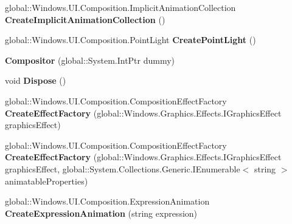 \begin{DoxyCompactItemize}
\item 
\mbox{\label{class_windows_1_1_u_i_1_1_composition_1_1_compositor_a24135a36c54df364a599ced5e16e5440}} 
global\+::\+Windows.\+U\+I.\+Composition.\+Implicit\+Animation\+Collection {\bfseries Create\+Implicit\+Animation\+Collection} ()
\item 
\mbox{\label{class_windows_1_1_u_i_1_1_composition_1_1_compositor_abbf5f6803a17b21b39e1cf6a0b23fc6e}} 
global\+::\+Windows.\+U\+I.\+Composition.\+Point\+Light {\bfseries Create\+Point\+Light} ()
\item 
\mbox{\label{class_windows_1_1_u_i_1_1_composition_1_1_compositor_ae8673b74eda4f57113626510ac491007}} 
{\bfseries Compositor} (global\+::\+System.\+Int\+Ptr dummy)
\item 
\mbox{\label{class_windows_1_1_u_i_1_1_composition_1_1_compositor_ac90a7018efb0edbc42378c43cb94e3fa}} 
void {\bfseries Dispose} ()
\item 
\mbox{\label{class_windows_1_1_u_i_1_1_composition_1_1_compositor_a0f263c7b996908ce12d789c3d640ee71}} 
global\+::\+Windows.\+U\+I.\+Composition.\+Composition\+Effect\+Factory {\bfseries Create\+Effect\+Factory} (global\+::\+Windows.\+Graphics.\+Effects.\+I\+Graphics\+Effect graphics\+Effect)
\item 
\mbox{\label{class_windows_1_1_u_i_1_1_composition_1_1_compositor_ac3bb6a6e92997bf4740fbf43e243ea7a}} 
global\+::\+Windows.\+U\+I.\+Composition.\+Composition\+Effect\+Factory {\bfseries Create\+Effect\+Factory} (global\+::\+Windows.\+Graphics.\+Effects.\+I\+Graphics\+Effect graphics\+Effect, global\+::\+System.\+Collections.\+Generic.\+I\+Enumerable$<$ string $>$ animatable\+Properties)
\item 
\mbox{\label{class_windows_1_1_u_i_1_1_composition_1_1_compositor_ae872b8e5d7605ff92461b38237f26bcf}} 
global\+::\+Windows.\+U\+I.\+Composition.\+Expression\+Animation {\bfseries Create\+Expression\+Animation} (string expression)

\end{DoxyCompactItemize}
